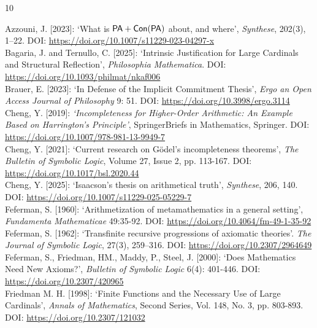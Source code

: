 \documentclass[a4paper,12pt]{amsart}
\theoremstyle{definition}
\numberwithin{equation}{section}
\begin{document}
\begin{thebibliography}{10}

Azzouni, J. [2023]: `What is $\sf PA + Con(PA)$ about, and where', \emph{Synthese}, 202(3), 1–22. DOI: \url{https://doi.org/10.1007/s11229-023-04297-x}\\
 
Bagaria, J. and Ternullo, C. [2025]: `Intrinsic Justification for Large Cardinals and Structural
 Reflection', \emph{Philosophia Mathematica}. DOI: \url{https://doi.org/10.1093/philmat/nkaf006}\\ 

Brauer, E. [2023]: `In Defense of the Implicit Commitment Thesis', \emph{Ergo an Open Access Journal of Philosophy} 9: 51. DOI: \url{https://doi.org/10.3998/ergo.3114}\\ 
                                
Cheng, Y. [2019]: \emph{`Incompleteness for Higher-Order Arithmetic: An Example Based on Harrington's Principle'}, SpringerBriefs in Mathematics, Springer. DOI: \url{https://doi.org/10.1007/978-981-13-9949-7}\\
          
Cheng, Y. [2021]: `Current research on G\"{o}del's incompleteness theorems', \emph{The Bulletin of Symbolic Logic}, Volume 27, Issue 2,  pp. 113-167.  DOI: \url{https://doi.org/10.1017/bsl.2020.44}\\

Cheng, Y. [2025]: `Isaacson's thesis on arithmetical truth',  \emph{Synthese}, 206, 140. DOI: \url{https://doi.org/10.1007/s11229-025-05229-7}\\


Feferman, S. [1960]: `Arithmetization of metamathematics in a general setting', \emph{Fundamenta Mathematicae} 49:35-92. DOI: \url{https://doi.org/10.4064/fm-49-1-35-92}\\

Feferman, S. [1962]: `Transfinite recursive progressions of axiomatic theories'. \emph{The Journal of Symbolic Logic}, 27(3), 259–316.  DOI: \url{https://doi.org/10.2307/2964649}\\ 
  

Feferman, S., Friedman, HM., Maddy, P., Steel, J. [2000]: `Does Mathematics Need New Axioms?', \emph{Bulletin of Symbolic Logic} 6(4): 401-446. DOI: \url{https://doi.org/10.2307/420965}\\ 

Friedman M. H. [1998]: `Finite Functions and the Necessary Use of Large Cardinals', \emph{Annals of Mathematics}, Second Series, Vol. 148, No. 3, pp. 803-893. DOI: \url{https://doi.org/10.2307/121032}\\


\end{thebibliography}
\end{document}
